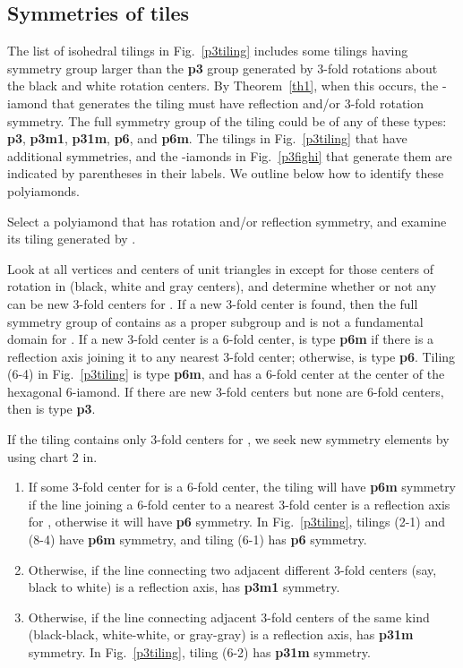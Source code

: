 \documentclass{ws-ijcga}
\begin{document}
\subsection{Symmetries of tiles}
\label{p3:sym}
The list of isohedral tilings in Fig.~\ref{p3tiling} includes some tilings having symmetry group larger than
the {\bf p3} group  generated by 3-fold rotations about the black and white rotation centers. 
By Theorem~\ref{th1}, when this occurs, the -iamond that generates the tiling must have reflection and/or
3-fold rotation symmetry. 
The full symmetry group of the tiling could be of any of these types:
{\bf p3}, {\bf p3m1}, {\bf p31m}, {\bf p6}, and {\bf p6m}. 
The tilings in Fig.~\ref{p3tiling} that have additional symmetries, and the
-iamonds in Fig.~\ref{p3fighi} that generate them are indicated by parentheses in their labels. 
We outline below how to identify these polyiamonds.

\begin{itemlist}
\item
Select a polyiamond  that has rotation and/or reflection symmetry, and examine its tiling
 generated by .
\item
Look at all vertices and centers of unit triangles in  except for those centers of rotation in
 (black, white and gray centers), and determine whether or not any can be new 3-fold centers
for . 
If a new 3-fold center is found, then the full symmetry group  of  contains  as a
proper subgroup and  is not a fundamental domain for . 
If a new 3-fold center is a 6-fold
center,  is type {\bf p6m} if there is a reflection axis joining it to any nearest 3-fold center;
otherwise,  is type {\bf p6}. 
Tiling (6-4) in Fig.~\ref{p3tiling} is type {\bf p6m}, and has a 6-fold center at the center
of the hexagonal 6-iamond. 
If there are new 3-fold centers but none are 6-fold centers, then  is type {\bf p3}.
\item
If the tiling contains only 3-fold centers for , 
we seek new symmetry elements by using chart 2 in\cite{schatt}. \begin{enumerate}
\item
If some 3-fold center for  is a 6-fold center, 
the tiling  will have {\bf p6m} symmetry if the
line joining a 6-fold center to a nearest 3-fold center is a reflection axis for , 
otherwise it will have {\bf p6} symmetry. 
In Fig.~\ref{p3tiling}, tilings (2-1) and (8-4) have {\bf p6m} symmetry, 
and tiling (6-1) has {\bf p6} symmetry.
\item
Otherwise, if the line connecting two adjacent different 3-fold centers 
(say, black to white) is a reflection axis,  has {\bf p3m1} symmetry.
\item
Otherwise, if the line connecting adjacent 3-fold centers of the same kind 
(black-black, white-white, or gray-gray) is a reflection axis, 
 has {\bf p31m} symmetry. 
In Fig.~\ref{p3tiling}, tiling (6-2) has {\bf p31m} symmetry.
\end{enumerate}
\end{itemlist}
\end{document}
